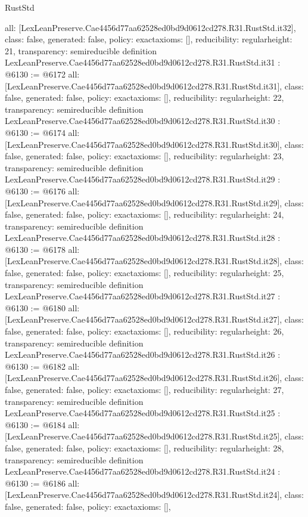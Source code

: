 \begin{lexlean}{RustStd}
\begin{coremodule}
{  all: [LexLeanPreserve.Cae4456d77aa62528ed0bd9d0612cd278.R31.RustStd.it32],
  class: false,
  generated: false,
  policy: exact{axioms: []},
  reducibility: regular{height: 21},
  transparency: semireducible
}
definition LexLeanPreserve.Cae4456d77aa62528ed0bd9d0612cd278.R31.RustStd.it31 : @6130 := @6172 {
  all: [LexLeanPreserve.Cae4456d77aa62528ed0bd9d0612cd278.R31.RustStd.it31],
  class: false,
  generated: false,
  policy: exact{axioms: []},
  reducibility: regular{height: 22},
  transparency: semireducible
}
definition LexLeanPreserve.Cae4456d77aa62528ed0bd9d0612cd278.R31.RustStd.it30 : @6130 := @6174 {
  all: [LexLeanPreserve.Cae4456d77aa62528ed0bd9d0612cd278.R31.RustStd.it30],
  class: false,
  generated: false,
  policy: exact{axioms: []},
  reducibility: regular{height: 23},
  transparency: semireducible
}
definition LexLeanPreserve.Cae4456d77aa62528ed0bd9d0612cd278.R31.RustStd.it29 : @6130 := @6176 {
  all: [LexLeanPreserve.Cae4456d77aa62528ed0bd9d0612cd278.R31.RustStd.it29],
  class: false,
  generated: false,
  policy: exact{axioms: []},
  reducibility: regular{height: 24},
  transparency: semireducible
}
definition LexLeanPreserve.Cae4456d77aa62528ed0bd9d0612cd278.R31.RustStd.it28 : @6130 := @6178 {
  all: [LexLeanPreserve.Cae4456d77aa62528ed0bd9d0612cd278.R31.RustStd.it28],
  class: false,
  generated: false,
  policy: exact{axioms: []},
  reducibility: regular{height: 25},
  transparency: semireducible
}
definition LexLeanPreserve.Cae4456d77aa62528ed0bd9d0612cd278.R31.RustStd.it27 : @6130 := @6180 {
  all: [LexLeanPreserve.Cae4456d77aa62528ed0bd9d0612cd278.R31.RustStd.it27],
  class: false,
  generated: false,
  policy: exact{axioms: []},
  reducibility: regular{height: 26},
  transparency: semireducible
}
definition LexLeanPreserve.Cae4456d77aa62528ed0bd9d0612cd278.R31.RustStd.it26 : @6130 := @6182 {
  all: [LexLeanPreserve.Cae4456d77aa62528ed0bd9d0612cd278.R31.RustStd.it26],
  class: false,
  generated: false,
  policy: exact{axioms: []},
  reducibility: regular{height: 27},
  transparency: semireducible
}
definition LexLeanPreserve.Cae4456d77aa62528ed0bd9d0612cd278.R31.RustStd.it25 : @6130 := @6184 {
  all: [LexLeanPreserve.Cae4456d77aa62528ed0bd9d0612cd278.R31.RustStd.it25],
  class: false,
  generated: false,
  policy: exact{axioms: []},
  reducibility: regular{height: 28},
  transparency: semireducible
}
definition LexLeanPreserve.Cae4456d77aa62528ed0bd9d0612cd278.R31.RustStd.it24 : @6130 := @6186 {
  all: [LexLeanPreserve.Cae4456d77aa62528ed0bd9d0612cd278.R31.RustStd.it24],
  class: false,
  generated: false,
  policy: exact{axioms: []},
}
\end{coremodule}
\end{lexlean}
